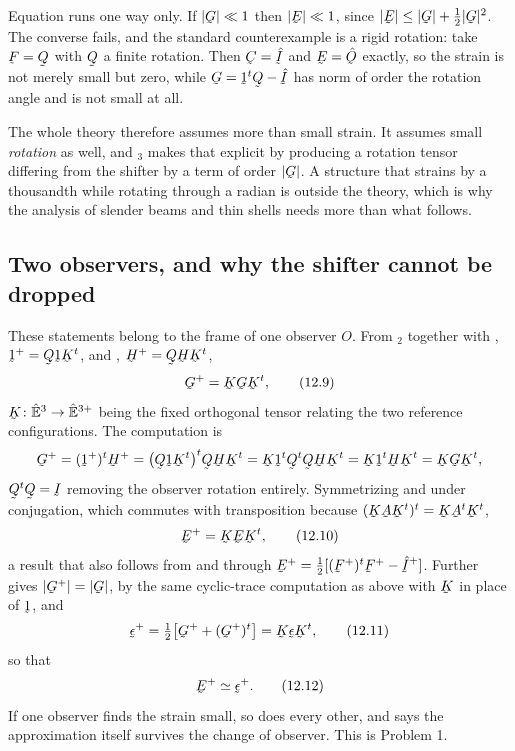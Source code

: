 \begin{remark}\label{rem:ch12weaker}
Equation  runs one way only. If $|\bG|\ll1$ then $|\bE|\ll1$,
since $|\bE|\le|\bG|+\tfrac12|\bG|^{2}$. The converse fails, and the
standard counterexample is a rigid rotation: take $\bF=\bQ$ with $\bQ$ a
finite rotation. Then $\bC=\hI$ and $\bE=\hOb$ exactly, so the strain is
not merely small but zero, while $\bG=\shift^{t}\bQ-\hI$ has norm of
order the rotation angle and is not small at all.

The whole theory therefore assumes more than small strain. It assumes
small \emph{rotation} as well, and $_{3}$ makes that explicit
by producing a rotation tensor differing from the shifter by a term of
order $|\bG|$. A structure that strains by a thousandth while rotating
through a radian is outside the theory, which is why the analysis of
slender beams and thin shells needs more than what follows.
\end{remark}

\subsection*{Two observers, and why the shifter cannot be dropped}

These statements belong to the frame of one observer $O$. From
$_{2}$ together with , $\shift^{+}=\bQ\shift\bK^{t}$,
and , $\bH^{+}=\bQ\bH\bK^{t}$,
\begin{equation}
   \bG^{+}=\bK\bG\bK^{t},
   \tag{12.9}\label{eq:12.9}
\end{equation}
$\bK\colon\hVt\to\hat{\mathbb{E}}^{3+}$ being the fixed orthogonal tensor relating the
two reference configurations. The computation is
\[
   \bG^{+}=(\shift^{+})^{t}\bH^{+}
   =\big(\bQ\shift\bK^{t}\big)^{t}\bQ\bH\bK^{t}
   =\bK\shift^{t}\bQ^{t}\bQ\bH\bK^{t}
   =\bK\shift^{t}\bH\bK^{t}=\bK\bG\bK^{t},
\]
$\bQ^{t}\bQ=\I$ removing the observer rotation entirely. Symmetrizing
 and  under conjugation, which commutes with
transposition because $(\bK\bA\bK^{t})^{t}=\bK\bA^{t}\bK^{t}$,
\begin{equation}
   \bE^{+}=\bK\bE\bK^{t},
   \tag{12.10}\label{eq:12.10}
\end{equation}
a result that also follows from  and  through
$\bE^{+}=\tfrac12[(\bF^{+})^{t}\bF^{+}-\hI^{+}]$. Further 
gives $|\bG^{+}|=|\bG|$, by the same cyclic-trace computation as above
with $\bK$ in place of $\shift$, and
\begin{equation}
   \vek{\epsilon}^{+}=\tfrac12\big[\bG^{+}+(\bG^{+})^{t}\big]
   =\bK\vek{\epsilon}\bK^{t},
   \tag{12.11}\label{eq:12.11}
\end{equation}
so that
\begin{equation}
   \bE^{+}\simeq\vek{\epsilon}^{+}.
   \tag{12.12}\label{eq:12.12}
\end{equation}
If one observer finds the strain small, so does every other, and
 says the approximation itself survives the change of
observer. This is Problem 1.


